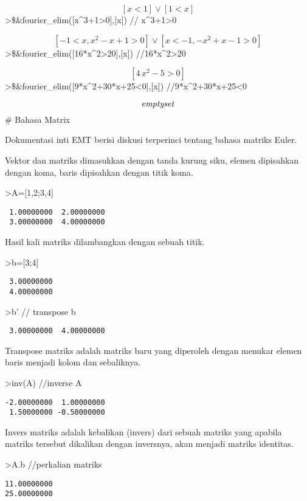 \documentclass[
]{book}
\begin{document}
\[\left[ x<1 \right] \lor \left[ 1<x \right] \]\textgreater\$\&fourier\_elim({[}x\^{}3+1\textgreater0{]},{[}x{]}) // x\^{}3+1\textgreater0

\[\left[ -1<x , x^2-x+1>0 \right] \lor \left[ x<-1 , -x^2+x-1>0
  \right] \]\textgreater\$\&fourier\_elim({[}16*x\^{}2\textgreater20{]},{[}x{]}) //16*x\^{}2\textgreater20

\[\left[ 4\,x^2-5>0 \right] \]\textgreater\$\&fourier\_elim({[}9*x\^{}2+30*x+25\textless0{]},{[}x{]}) //9*x\^{}2+30*x+25\textless0

\[{\it emptyset}\]\# Bahasa Matrix

Dokumentasi inti EMT berisi diskusi terperinci tentang bahasa matriks Euler.

Vektor dan matriks dimasukkan dengan tanda kurung siku, elemen dipisahkan dengan koma, baris dipisahkan dengan titik koma.

\textgreater A={[}1,2;3,4{]}

\begin{verbatim}
 1.00000000  2.00000000 
 3.00000000  4.00000000 
\end{verbatim}

Hasil kali matriks dilambangkan dengan sebuah titik.

\textgreater b={[}3;4{]}

\begin{verbatim}
 3.00000000 
 4.00000000 
\end{verbatim}

\textgreater b' // transpose b

\begin{verbatim}
 3.00000000  4.00000000 
\end{verbatim}

Transpose matriks adalah matriks baru yang diperoleh dengan menukar elemen baris menjadi kolom dan sebaliknya.

\textgreater inv(A) //inverse A

\begin{verbatim}
-2.00000000  1.00000000 
 1.50000000 -0.50000000 
\end{verbatim}

Invers matriks adalah kebalikan (invers) dari sebuah matriks yang apabila matriks tersebut dikalikan dengan inversnya, akan menjadi matriks identitas.

\textgreater A.b //perkalian matriks

\begin{verbatim}
11.00000000 
25.00000000 
\end{verbatim}
\end{document}
